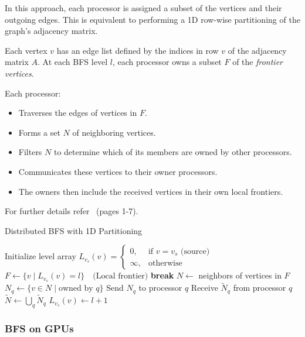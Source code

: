 \documentclass[12pt]{book}
\begin{document}
In this approach, each processor is assigned a subset of the vertices and their outgoing edges. This is equivalent to performing a 1D row-wise partitioning of the graph’s adjacency matrix.

Each vertex $v$ has an edge list defined by the indices in row $v$ of the adjacency matrix $A$. At each BFS level $l$, each processor owns a subset $F$ of the \textit{frontier vertices}.

Each processor:
\begin{itemize}
    \item Traverses the edges of vertices in $F$.
    \item Forms a set $N$ of neighboring vertices.
    \item Filters $N$ to determine which of its members are owned by other processors.
    \item Communicates these vertices to their owner processors.
    \item The owners then include the received vertices in their own local frontiers.
\end{itemize}
For further details refer~\cite{yoo2005scalable} (pages 1-7).
\begin{algorithm}[H]
\caption{Distributed BFS with 1D Partitioning}
\label{alg:1DBFS}
\begin{algorithmic}[1]
\State Initialize level array $L_{v_s}(v) = \begin{cases}
    0, & \text{if } v = v_s \text{ (source)} \\
    \infty, & \text{otherwise}
\end{cases}$
    \State $F \gets \{v \mid L_{v_s}(v) = l\} \quad \text{(Local frontier)}$
        \State \textbf{break} 
    \EndIf
    \State $N \gets$ neighbors of vertices in $F$
        \State $N_q \gets \{v \in N \mid \text{owned by } q\}$
        \State Send $N_q$ to processor $q$
        \State Receive $\tilde{N}_q$ from processor $q$
    \EndFor
    \State $\tilde{N} \gets \bigcup_q \tilde{N}_q$ 
        \State $L_{v_s}(v) \gets l + 1$
    \EndFor
\EndFor
\end{algorithmic}
\end{algorithm}

\subsubsection{BFS on GPUs}
\end{document}
